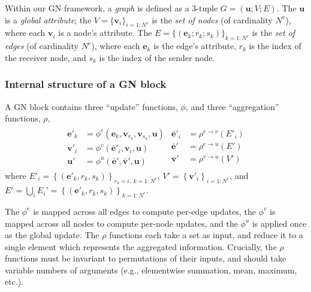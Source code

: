 \documentclass[10pt]{book}
\newcommand{\uv}{\mathbf{u}}    %
\newcommand{\ev}{\mathbf{e}}    %
\newcommand{\vv}{\mathbf{v}}    %
\let\defaultmarginpar\marginpar
\renewcommand\marginpar[2][]{\defaultmarginpar{\itshape\color{gray}#2}}
\begin{document}
Within our GN framework, a \emph{graph}\marginpar{graph} is defined as a 3-tuple $G = (\uv; V; E)$. The $\uv$ is a \emph{global attribute}; the $V = \{\vv_i \}_{i=1:N^v}$ is the \emph{set of nodes} (of cardinality $N^v$), where each $\mathbf v_i$ is a node's attribute. The $E = \{(\ev_k; r_k; s_k)\}_{k=1:N^e}$ is the \emph{set of edges} (of cardinality $N^e$), where each $\ev_k$ is the edge's attribute, $r_k$ is the index of the receiver node, and $s_k$ is the index of the sender node.

\subsubsection{Internal structure of a GN block}

A GN block contains three ``update'' functions, $\phi$, and three ``aggregation'' functions, $\rho$,
\begin{align}
  \begin{split}
    \ev'_k &= \phi^e\left(\ev_k, \vv_{r_k}, \vv_{s_k}, \uv \right) \\
    \vv'_i &= \phi^v\left(\mathbf{\bar{e}}'_i, \vv_i, \uv \right) \\
    \uv' &= \phi^u\left(\mathbf{\bar{e}}', \mathbf{\bar{v}}', \uv \right)
  \end{split}
  \begin{split}
    \mathbf{\bar{e}}'_i &= \rho^{e \rightarrow v}\left(E'_i\right) \\
    \mathbf{\bar{e}}' &= \rho^{e \rightarrow u}\left(E'\right) \\
    \mathbf{\bar{v}}' &= \rho^{v \rightarrow u}\left(V'\right)   
  \end{split}
  \label{eq:gn-functions}
\end{align}
where $E'_i = \left\{\left(\ev'_k, r_k, s_k \right)\right\}_{r_k=i,\; k=1:N^e}$, $V'=\left\{\vv'_i\right\}_{i=1:N^v}$, and $E' = \bigcup_i E_i' = \left\{\left(\ev'_k, r_k, s_k \right)\right\}_{k=1:N^e}$.

The $\phi^e$ is mapped across all edges to compute per-edge updates, the $\phi^v$ is mapped across all nodes to compute per-node updates, and the $\phi^u$ is applied once as the global update.
%
The $\rho$ functions each take a set as input, and reduce it to a single element which represents the aggregated information. Crucially, the $\rho$ functions must be invariant to permutations of their inputs, and should take variable numbers of arguments (e.g., elementwise summation, mean, maximum, etc.).
\end{document}
